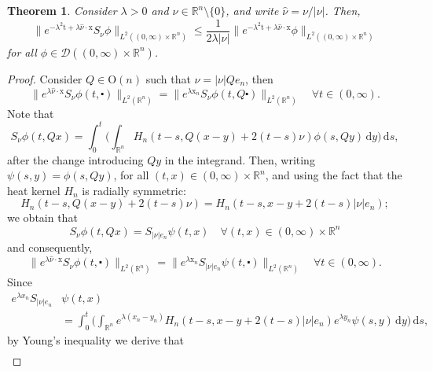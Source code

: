 \documentclass[10pt,a4paper]{amsart}
\newtheorem{theorem}[proposition]{Theorem}
\theoremstyle{remark}
\theoremstyle{definition}
\newcommand{\R}{\mathbb{R}}
\newcommand{\dd}{\mathrm{d}}
\newcommand{\tm}{\mathrm{t}}
\newcommand{\x}{\mathrm{x}}
\begin{document}
\begin{theorem}\label{thm:key-inequality}\sl Consider $\lambda > 0$ and $\nu \in \R^n \setminus\{ 0 \}$, and
write $\hat{\nu} = \nu/|\nu|$.
Then, 
\[\| e^{-\lambda^2 \tm + \lambda \hat{\nu} \cdot \x} S_\nu \phi \|_{L^2((0, \infty) \times \R^n)} \leq \frac{1}{2 \lambda |\nu|} \| e^{-\lambda^2 \tm + \lambda \hat{\nu} \cdot \x} \phi \|_{L^2((0, \infty) \times \R^n)} \]
for all $\phi \in \mathcal{D}((0, \infty) \times \R^n)$.
\end{theorem}
\begin{proof}
Consider $Q \in \mathrm{O}(n)$ such that $ \nu=|\nu| Q e_n $, then
$$
\| e^{\lambda \hat{\nu} \cdot \x} S_\nu \phi (t, \centerdot) \|_{L^2(\R^n)}=\| e^{\lambda  \x_n} S_\nu \phi (t, Q \centerdot) \|_{L^2(\R^n)} \quad \forall t \in (0, \infty).
$$
Note that
\[ S_\nu \phi(t, Qx) = \int_0^t \Big( \int_{\R^n} H_n (t-s, Q (x - y) + 2(t-s) \nu) \phi(s, Qy) \, \dd y \Big) \, \dd s, \]
after the change introducing $Qy$ in the integrand. Then, writing
$\psi(s,y)=\phi(s, Qy)$, for all $(t,x) \in (0, \infty) \times \R^n$, and using the fact that
the heat kernel $H_n$ is radially symmetric:
$$
H_n (t-s, Q (x - y) + 2(t-s) \nu) = H_n (t-s, x - y + 2(t-s) |\nu| e_n);
$$
we obtain that
$$
S_\nu \phi(t, Qx)= S_{|\nu| e_n} \psi(t, x) \quad \forall(t, x) \in (0, \infty) \times \mathbb{R}^n
$$
and consequently,
$$
\| e^{\lambda \hat{\nu} \cdot \x} S_\nu \phi (t, \centerdot) \|_{L^2(\R^n)}=\| e^{\lambda  \x_n} S_{|\nu| e_n} \psi (t, \centerdot) \|_{L^2(\R^n)} \quad \forall t \in (0, \infty).
$$
Since
\begin{align*}
e^{\lambda x_n} S_{|\nu| e_n} & \psi(t, x)\\
& = \int_0^t \Big( \int_{\R^n} e^{\lambda (x_n-y_n)} H_n (t-s, x - y + 2(t-s) |\nu| e_n) e^{\lambda y_n} \psi(s,y) \, \dd y \Big) \, \dd s,
\end{align*}
by Young's inequality we derive that
\begin{align*}

\end{align*}
\end{proof}
\end{document}
